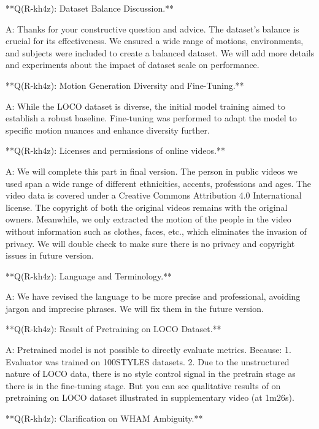\documentclass{article}
\begin{document}
\begin{markdown}
**Q(R-kh4z): Dataset Balance Discussion.**

A: Thanks for your constructive question and advice. The dataset's balance is crucial for its effectiveness. We ensured a wide range of motions, environments, and subjects were included to create a balanced dataset. We will add more details and experiments about the impact of dataset scale on performance. 

**Q(R-kh4z): Motion Generation Diversity and Fine-Tuning.**

A: While the LOCO dataset is diverse, the initial model training aimed to establish a robust baseline. Fine-tuning was performed to adapt the model to specific motion nuances and enhance diversity further. 


**Q(R-kh4z): Licenses and permissions of online videos.**

A: We will complete this part in final version. The person in public videos we used span a wide range of different ethnicities, accents, professions and ages. The video data is covered under a Creative Commons Attribution 4.0 International license. The copyright of both the original videos remains with the original owners. Meanwhile, we only extracted the motion of the people in the video without information such as clothes, faces, etc., which eliminates the invasion of privacy. We will double check to make sure there is no privacy and copyright issues in future version.

**Q(R-kh4z): Language and Terminology.**

A: We have revised the language to be more precise and professional, avoiding jargon and imprecise phrases. We will fix them in the future version.

**Q(R-kh4z): Result of Pretraining on LOCO Dataset.**

A: Pretrained model is not possible to directly evaluate metrics. Because: 1. Evaluator was trained on 100STYLES datasets. 2. Due to the unstructured nature of LOCO data, there is no style control signal in the pretrain stage as there is in the fine-tuning stage. But you can see qualitative results of on pretraining on LOCO dataset illustrated in supplementary video (at 1m26s).

**Q(R-kh4z): Clarification on WHAM Ambiguity.**


\end{markdown}
\end{document}
